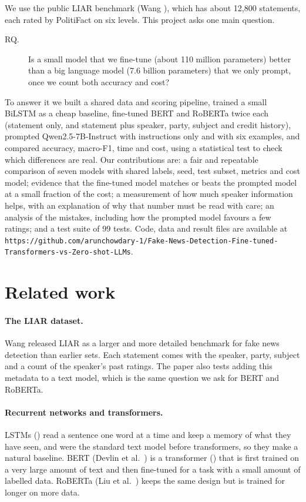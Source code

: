 \documentclass{nle}
\begin{document}
We use the public LIAR benchmark (Wang ), which has about 12,800 statements, each rated by
PolitiFact on six levels. This project asks one main question.
\begin{description}
  \item[RQ.] Is a small model that we fine-tune (about 110 million parameters) better than a big language
        model (7.6 billion parameters) that we only prompt, once we count both accuracy and cost?
\end{description}
To answer it we built a shared data and scoring pipeline, trained a small BiLSTM as a cheap baseline,
fine-tuned BERT and RoBERTa twice each (statement only, and statement plus speaker, party, subject and
credit history), prompted Qwen2.5-7B-Instruct with instructions only and with six examples, and compared
accuracy, macro-F1, time and cost, using a statistical test to check which differences are real.
Our contributions are: a fair and repeatable comparison of seven models with shared labels, seed, test subset,
metrics and cost model; evidence that the fine-tuned model matches or beats the prompted model at a small
fraction of the cost; a measurement of how much speaker information helps, with an explanation of why that
number must be read with care; an analysis of the mistakes, including how the prompted model favours a few
ratings; and a test suite of 99 tests. Code, data and result files are available at
\texttt{https://github.com/arunchowdary-1/Fake-News-Detection-Fine-tuned-Transformers-vs-Zero-shot-LLMs}.

\section{Related work}

\paragraph{The LIAR dataset.} Wang  released LIAR as a larger and more detailed benchmark for
fake news detection than earlier sets. Each statement comes with the speaker, party, subject and a count of
the speaker's past ratings. The paper also tests adding this metadata to a text model, which is the same
question we ask for BERT and RoBERTa.

\paragraph{Recurrent networks and transformers.} LSTMs (\cite{hochreiter97}) read a sentence one word at a
time and keep a memory of what they have seen, and were the standard text model before transformers, so they
make a natural baseline. BERT (Devlin et al.\ ) is a transformer (\cite{vaswani17}) that
is first trained on a very large amount of text and then fine-tuned for a task with a small amount of labelled
data. RoBERTa (Liu et al.\ ) keeps the same design but is trained for longer on more data.
\end{document}
